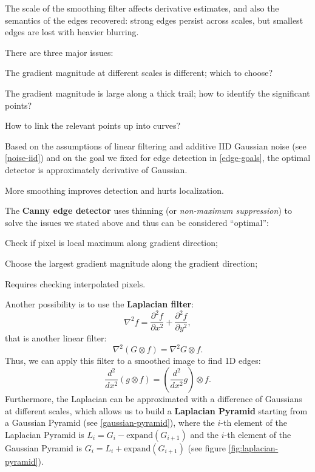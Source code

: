 \begin{obs}
    The scale of the smoothing filter affects derivative estimates, and also the semantics of the edges recovered: strong edges persist across scales, but smallest edges are lost with heavier blurring.
\end{obs}

There are three major issues:
\begin{myitem}
    \item The gradient magnitude at different scales is different; which to choose?
    \item The gradient magnitude is large along a thick trail; how to identify the significant points?
    \item How to link the relevant points up into curves?
\end{myitem}

\begin{obs}
    Based on the assumptions of linear filtering and additive IID Gaussian noise (see \ref{noise-iid}) and on the goal we fixed for edge detection in \ref{edge-goals}, the optimal detector is approximately derivative of Gaussian.
\end{obs}

\begin{obs}
    More smoothing improves detection and hurts localization.
\end{obs}

The \textbf{Canny edge detector} uses thinning (or \textit{non-maximum suppression}) to solve the issues we stated above and thus can be considered ``optimal'':
\begin{myitem}
    \item Check if pixel is local maximum along gradient direction;
    \item Choose the largest gradient magnitude along the gradient direction;
    \item Requires checking interpolated pixels.
\end{myitem}

Another possibility is to use the \textbf{Laplacian filter}:
\begin{equation}\label{eq:laplacian}
    \nabla^2 f = \frac{\partial^2 f}{\partial x^2} + \frac{\partial^2 f}{\partial y^2},
\end{equation}
that is another linear filter:
\begin{equation}\label{eq:laplacian-filter}
    \nabla^2 (G \otimes f) = \nabla^2 G \otimes f.
\end{equation}
Thus, we can apply this filter to a smoothed image to find 1D edges:
\begin{equation}\label{eq:laplacian-g}
    \frac{d^2}{dx^2} (g \otimes f) = \left( \frac{d^2}{dx^2} g \right) \otimes f.
\end{equation}
Furthermore, the Laplacian can be approximated with a difference of Gaussians at different scales, which allows us to build a \textbf{Laplacian Pyramid} starting from a Gaussian Pyramid (see \ref{gaussian-pyramid}), where the $i$-th element of the Laplacian Pyramid is $L_i = G_i - \text{expand}(G_{i+1})$ and the $i$-th element of the Gaussian Pyramid is $G_i = L_i + \text{expand}(G_{i+1})$ (see figure \ref{fig:laplacian-pyramid}).

